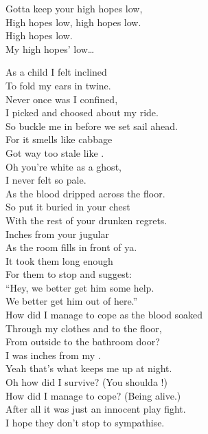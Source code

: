 Gotta keep your high hopes low, \\
High hopes low, high hopes low. \\

High hopes low. \\

My high hopes' low… \\




As a child I felt inclined \\
To fold my ears in twine. \\
Never once was I confined, \\
I picked and choosed about my ride. \\
So buckle me in before we set sail ahead. \\
For it smells like cabbage \\
Got way too stale like . \\

Oh you're white as a ghost, \\
I never felt so pale. \\
As the blood dripped across the floor. \\

So put it buried in your chest \\
With the rest of your drunken regrets. \\
Inches from your jugular \\
As the room fills in front of ya. \\

It took them long enough \\
For them to stop and suggest: \\
``Hey, we better get him some help. \\
We better get him out of here.'' \\

How did I manage to cope as the blood soaked \\
Through my clothes and to the floor, \\
From outside to the bathroom door? \\
I was inches from my . \\
Yeah that's what keeps me up at night. \\

Oh how did I survive? (You shoulda !) \\
How did I manage to cope? (Being alive.) \\
After all it was just an innocent play fight. \\
I hope they don't stop to sympathise. \\

